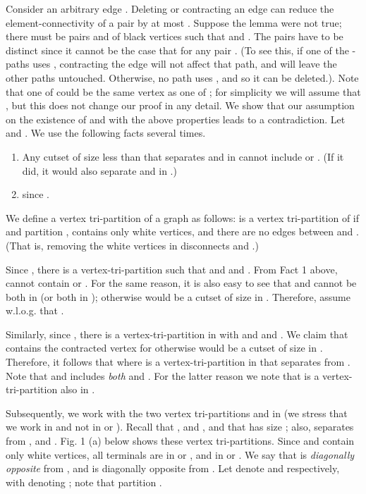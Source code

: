 \documentclass[11pt]{article}
\renewenvironment{proof}{\vspace{-0.1in}\noindent{\bf Proof:}}{\hspace*{\fill}\par}
\begin{document}
\begin{proof}
  Consider an arbitrary edge . Deleting or contracting an edge can
  reduce the element-connectivity of a pair by at most .  Suppose
  the lemma were not true; there must be pairs  and  of
  black vertices such that 
  and . The pairs have to be
  distinct since it cannot be the case that  for any pair . (To see
  this, if one of the  - paths uses ,
  contracting the edge will not affect that path, and will leave the
  other paths untouched. Otherwise, no path uses , and so it can
  be deleted.). Note that one of  could be the same vertex as one
  of ; for simplicity we will assume that , but this does not change our proof in any detail.  We
  show that our assumption on the existence of  and  with
  the above properties leads to a contradiction. Let  and . We use the following facts
  several times. 

  \vspace{-0.15in}
  \begin{enumerate}
    \item Any cutset of size less than  that separates  and
       in  cannot include  or . (If it did, it would
      also separate  and  in .)

    \item  since .
  \end{enumerate}

  We define a vertex tri-partition of a graph  as follows:
   is a vertex tri-partition of  if  and 
  partition ,  contains only white vertices, and there are no
  edges between  and . (That is, removing the white vertices in
   disconnects  and .)

  Since , there is a
  vertex-tri-partition  such that  and 
  and .  From Fact 1 above,  cannot contain  or
  . For the same reason, it is also easy to see that  and 
  cannot be both in  (or both in ); otherwise  would be a
  cutset of size  in . Therefore, assume w.l.o.g. that .
  
  Similarly, since , there is a
  vertex-tri-partition  in  with  and
   and . We claim that  contains the contracted
  vertex  for otherwise  would be a cutset of size  in
  . Therefore, it follows that  where  is a vertex-tri-partition in  that separates 
  from . Note that  and  includes {\em both}  and .
  For the latter reason we note that  is a vertex-tri-partition
  also in .

  Subsequently, we work with the two vertex tri-partitions 
  and  in  (we stress that we work in  and not in
   or ). Recall that , and , and that
   has size ; also,  separates  from , and .  Fig. 1 (a) below shows these vertex tri-partitions. Since
   and  contain only white vertices, all terminals are in  or
  , and in  or . We say that  is \emph{diagonally
    opposite} from , and  is diagonally opposite
  from . Let  denote 
  and  respectively, with  denoting ; note that
   partition .


\end{proof}
\end{document}
